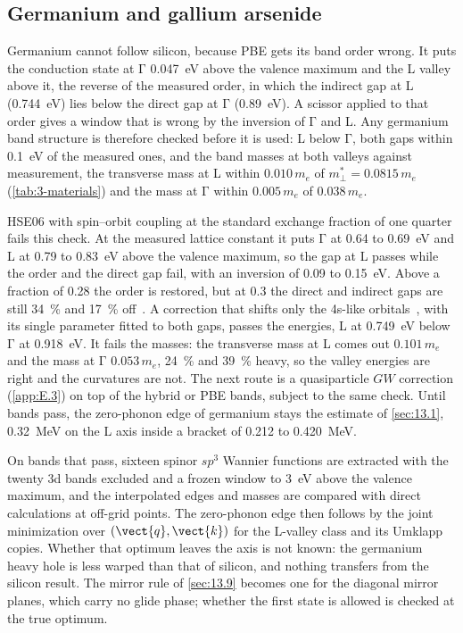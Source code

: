 \subsection{Germanium and gallium arsenide}

Germanium cannot follow silicon, because PBE gets its band order wrong. It puts the conduction state at $\mathrm{\Gamma}$ \SI{0.047}{eV} above the valence maximum and the L valley above it, the reverse of the measured order, in which the indirect gap at L (\SI{0.744}{eV}) lies below the direct gap at $\mathrm{\Gamma}$ (\SI{0.89}{eV}). A scissor applied to that order gives a window that is wrong by the inversion of $\mathrm{\Gamma}$ and L. Any germanium band structure is therefore checked before it is used: L below $\mathrm{\Gamma}$, both gaps within \SI{0.1}{eV} of the measured ones, and the band masses at both valleys against measurement, the transverse mass at L within $0.010\,m_e$ of $m^*_\perp = 0.0815\,m_e$ (\cref{tab:3-materials}) and the mass at $\mathrm{\Gamma}$ within $0.005\,m_e$ of $0.038\,m_e$.

HSE06 with spin--orbit coupling at the standard exchange fraction of one quarter fails this check. At the measured lattice constant it puts $\mathrm{\Gamma}$ at 0.64 to \SI{0.69}{eV} and L at 0.79 to \SI{0.83}{eV} above the valence maximum, so the gap at L passes while the order and the direct gap fail, with an inversion of 0.09 to \SI{0.15}{eV}. Above a fraction of 0.28 the order is restored, but at 0.3 the direct and indirect gaps are still \SI{34}{\percent} and \SI{17}{\percent} off~\cite[Fig.~1(a)]{abdurrazaq2025accurate}. A correction that shifts only the 4s-like orbitals~\cite{abdurrazaq2025accurate}, with its single parameter fitted to both gaps, passes the energies, L at \SI{0.749}{eV} below $\mathrm{\Gamma}$ at \SI{0.918}{eV}. It fails the masses: the transverse mass at L comes out $0.101\,m_e$ and the mass at $\mathrm{\Gamma}$ $0.053\,m_e$, \SI{24}{\percent} and \SI{39}{\percent} heavy, so the valley energies are right and the curvatures are not. The next route is a quasiparticle $GW$ correction (\cref{app:E.3}) on top of the hybrid or PBE bands, subject to the same check. Until bands pass, the zero-phonon edge of germanium stays the estimate of \cref{sec:13.1}, \SI{0.32}{MeV} on the L axis inside a bracket of 0.212 to \SI{0.420}{MeV}.

On bands that pass, sixteen spinor $sp^3$ Wannier functions are extracted with the twenty 3d bands excluded and a frozen window to \SI{3}{eV} above the valence maximum, and the interpolated edges and masses are compared with direct calculations at off-grid points. The zero-phonon edge then follows by the joint minimization over $(\vect{q},\vect{k})$ for the L-valley class and its Umklapp copies. Whether that optimum leaves the axis is not known: the germanium heavy hole is less warped than that of silicon, and nothing transfers from the silicon result. The mirror rule of \cref{sec:13.9} becomes one for the diagonal mirror planes, which carry no glide phase; whether the first state is allowed is checked at the true optimum.

